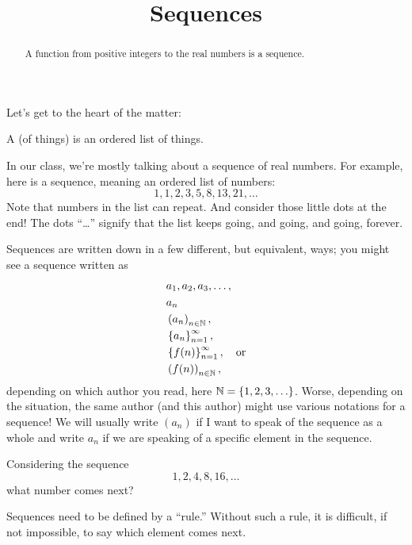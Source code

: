 \documentclass{ximera}
\title[Dig-In:]{Sequences}
\begin{document}
\begin{abstract}
  A function from positive integers to the real numbers is a sequence.
\end{abstract}
\maketitle

Let's get to the heart of the matter:

\begin{definition}
  A  (of things) is an ordered list of things.
\end{definition}

In our class, we're mostly talking about a sequence of real numbers.
For example, here is a sequence, meaning an ordered list of numbers:
\[
1,1, 2, 3, 5, 8, 13, 21, \ldots
\]
Note that numbers in the list can repeat.  And consider those little
dots at the end!  The dots ``\ldots'' signify that the list keeps
going, and going, and going, forever.

Sequences are written down in a few different, but equivalent,
ways; you might see a sequence written as
\begin{align*}
  & a_1, a_2,  a_3, \ldots, \\
  & a_n \\
  & \left(a_n\right)_{n \in \mathbb N}, \\
  & \left\{a_n\right\}_{n=1}^\infty, \\
  & \left\{f(n)\right\}_{n=1}^\infty, \quad \text{or} \\
  & \left(f(n)\right)_{n \in \mathbb N},
\end{align*}
depending on which author you read, here $\mathbb N=\{1,2,3,\ldots\}$.  Worse, depending on the
situation, the same author (and this author) might use various
notations for a sequence!  We will usually write $(a_n)$ if I want to
speak of the sequence as a whole and write $a_n$ if we are speaking of
a specific element in the sequence.


\begin{question}
  Considering the sequence
  \[
  1, 2, 4, 8, 16, \dots
  \]
  what number comes next?
  \begin{multipleChoice}
  \end{multipleChoice}
  \begin{feedback}
    Sequences need to be defined by a ``rule.'' Without such a rule,
    it is difficult, if not impossible, to say which element comes
    next.
  \end{feedback}
\end{question}
\end{document}
